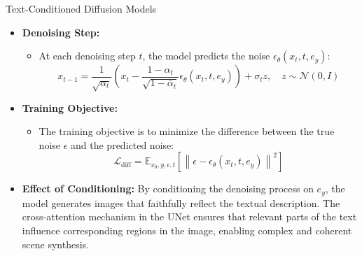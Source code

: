 \begin{frame}[allowframebreaks]{Text-Conditioned Diffusion Models}
\begin{itemize}
    \framebreak

    \item \textbf{Denoising Step:}
    \begin{itemize}
        \item At each denoising step $t$, the model predicts the noise $\epsilon_\theta(x_t, t, e_y)$:
        \[
        x_{t-1} = \frac{1}{\sqrt{\alpha_t}} \left( x_t - \frac{1-\alpha_t}{\sqrt{1-\bar{\alpha}_t}} \epsilon_\theta(x_t, t, e_y) \right) + \sigma_t z, \quad z \sim \mathcal{N}(0, I)
        \]
    \end{itemize}

    \framebreak

    \item \textbf{Training Objective:}
    \begin{itemize}
        \item The training objective is to minimize the difference between the true noise $\epsilon$ and the predicted noise:
        \[
        \mathcal{L}_{\text{diff}} = \mathbb{E}_{x_0, y, \epsilon, t} \left[ \left\| \epsilon - \epsilon_\theta(x_t, t, e_y) \right\|^2 \right]
        \]
    \end{itemize}

    \item \textbf{Effect of Conditioning:} By conditioning the denoising process on $e_y$, the model generates images that faithfully reflect the textual description. The cross-attention mechanism in the UNet ensures that relevant parts of the text influence corresponding regions in the image, enabling complex and coherent scene synthesis.
\end{itemize}
\end{frame}



